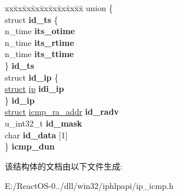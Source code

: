 \begin{DoxyCompactItemize}
\begin{tabbing}
\end{tabbing}\item 
\mbox{\label{structicmp_a5d63dad4b0f58bb56eb0b4e617408792}} 
\begin{tabbing}
xx\=xx\=xx\=xx\=xx\=xx\=xx\=xx\=xx\=\kill
union \{\\
\>struct {\bfseries id\_ts} \{\\
\>\>n\_time {\bfseries its\_otime}\\
\>\>n\_time {\bfseries its\_rtime}\\
\>\>n\_time {\bfseries its\_ttime}\\
\>\} {\bfseries id\_ts}\\
\>struct {\bfseries id\_ip} \{\\
\>\>\hyperlink{interfacestruct}{struct} \hyperlink{structip}{ip} {\bfseries idi\_ip}\\
\>\} {\bfseries id\_ip}\\
\>\hyperlink{interfacestruct}{struct} \hyperlink{structicmp__ra__addr}{icmp\_ra\_addr} {\bfseries id\_radv}\\
\>u\_int32\_t {\bfseries id\_mask}\\
\>char {\bfseries id\_data} \mbox{[}1\mbox{]}\\
\} {\bfseries icmp\_dun}\\

\end{tabbing}\end{DoxyCompactItemize}


该结构体的文档由以下文件生成\+:\begin{DoxyCompactItemize}
\item 
E\+:/\+React\+O\+S-\/0../dll/win32/iphlpapi/ip\+\_\+icmp.\+h\end{DoxyCompactItemize}
